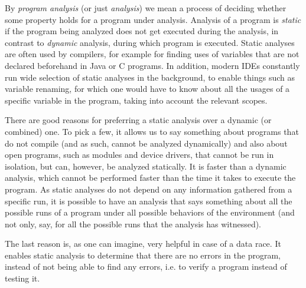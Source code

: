 \documentclass[..thesis.tex]{subfiles}
\begin{document}

By \textit{program analysis} (or just \textit{analysis}) we mean a process of deciding whether some property holds for a program under analysis.
Analysis of a program is \textit{static} if the program being analyzed does not get executed during the analysis, in contrast to \textit{dynamic} analysis,
during which program is executed. Static analyses are often used by compilers, for example for finding uses of variables that are not declared beforehand
in Java or C programs. In addition, modern IDEs constantly run wide selection of static analyses in the background, to enable things such as variable renaming,
for which one would have to know about all the usages of a specific variable in the program, taking into account the relevant scopes. 



There are good reasons for preferring a static analysis over a dynamic (or combined) one.
To pick a few, it allows us to say something about programs that do not compile (and as such, cannot be analyzed dynamically) and also about open programs,
such as modules and device drivers, that cannot be run in isolation, but can, however, be analyzed statically.  
It is faster than a dynamic analysis, which cannot be performed faster than the time it takes to execute the program. As static analyses do not depend on any information gathered from a specific run, it is possible to have an analysis that says something
about all the possible runs of a program under all possible behaviors of the environment (and not only, say, for all the possible runs that the analysis has witnessed).

The last reason is, as one can imagine, very helpful in case of a data race. It enables static analysis to determine that there are no errors in the program, instead of not being able to find any errors, i.e. to verify a program instead of testing it.


\end{document}
